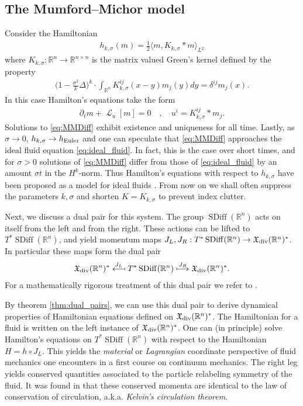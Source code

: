 \documentclass[12pt]{amsart}
\newcommand{\R}{\ensuremath{\mathbb{R}}}
\DeclareMathOperator{\SDiff}{SDiff}
\DeclareMathOperator{\lie}{\mathcal{L}}
\begin{document}
\subsection{The Mumford--Michor model}
\label{sec:MME}
Consider the Hamiltonian
\begin{align*}
  h_{k,\sigma}(m) = \frac{1}{2} \langle m , K_{k,\sigma} * m \rangle_{L^2} 
\end{align*}
where $K_{k,\sigma}:\R^n \to \mathbb{R}^{n \times n}$ is the matrix
valued Green's kernel defined by the property
\begin{align*}
 \Big(1 - \frac{\sigma^2}{k } \Delta \Big)^k \cdot \int_{\R^n} K_{k,\sigma}^{ij}(x - y) m_j(y) dy = \delta^{ij} m_j(x).
\end{align*}
In this case Hamilton's equations take the form
\begin{align}
	\partial_t m+ \lie_u [ m] = 0 \quad , \quad u^i  = K^{ij}_{k,\sigma} * m_j. \label{eq:MMDiff}
\end{align}
Solutions to \eqref{eq:MMDiff} exhibit existence and uniqueness for all time.
Lastly, as $\sigma \to 0$, $h_{k,\sigma} \to h_{\rm Euler}$ and one can speculate that \eqref{eq:MMDiff}
approaches the ideal fluid equation \eqref{eq:ideal_fluid}.
In fact, this is the case over short times, and for $\sigma > 0$ solutions of \eqref{eq:MMDiff}
differ from those of \eqref{eq:ideal_fluid} by an amount $\sigma t$
in the $H^k$-norm.
Thus Hamilton's equations with respect to $h_{k,\sigma}$ have been proposed
as a model for ideal fluids \cite[Theorems 2 and 3]{MumfordMichor2013}. From now on we shall often suppress the
parameters $k,\sigma$ and shorten $K = K_{k,\sigma}$ to prevent index
clutter.

Next, we discuss a dual pair for this system.
The group $\SDiff(\R^n)$ acts on itself from the left and from the right.
These actions can be lifted to $T^* \SDiff(\R^n)$, and yield
momentum maps $J_L,J_R : T^*\SDiff(\R^n) \to \mathfrak{X}_{\rm div}(\R^n)^*$. In particular these maps form the dual pair
\begin{align*}
  \mathfrak{X}_{\rm div}(\R^n)^*
  \stackrel{J_L}{\longmapsfrom}
  T^* \SDiff(\R^n)
  \stackrel{J_R}{\longmapsto}
  \mathfrak{X}_{\rm div}(\R^n)^*.
\end{align*}
For a mathematically rigorous treatment of this dual pair we refer to \cite{Gay-BalmazVizman2011}.

By theorem \ref{thm:dual_pairs}, we can use this dual pair to derive dynamical properties of Hamiltonian equations defined on $\mathfrak{X}_{\rm div}(\R^n)^*$.
The Hamiltonian for a fluid is written on the left instance of $\mathfrak{X}_{\rm div}(\R^n)^*$.
One can (in principle) solve Hamilton's equations on $T^*\SDiff(\R^n)$
with respect to the Hamiltonian $H = h \circ J_L$.
This yields the \emph{material} or \emph{Lagrangian} coordinate perspective
of fluid mechanics one encounters in a first course on continuum
mechanics.
The right leg yields conserved quantities associated to the particle relabeling symmetry of the fluid.
It was found in \cite{Arnold1966} that these conserved momenta are identical
to the law of conservation of circulation, a.k.a. \emph{Kelvin's circulation theorem}.
\end{document}
